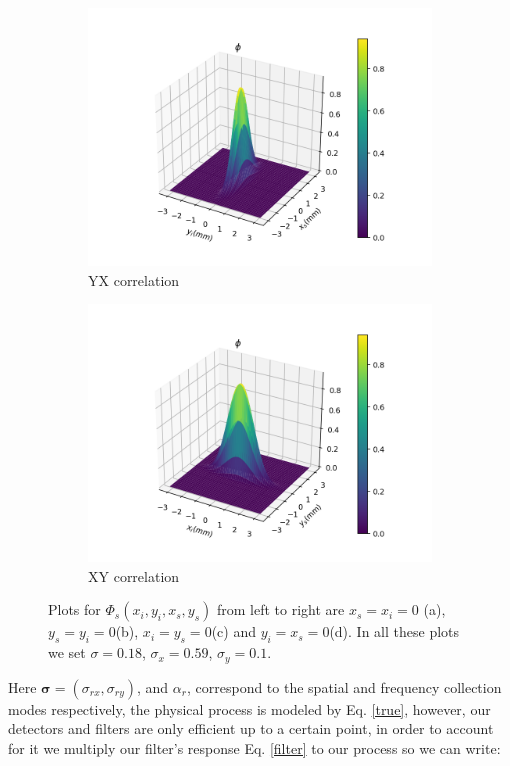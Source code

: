\documentclass[12pt]{book}
\begin{document}
\begin{figure}[t!]
\begin{subfigure}[b]{0.45\linewidth}
\includegraphics[width=\linewidth]{images/SPDC_yx.png}
\caption{YX correlation}
\end{subfigure}
\begin{subfigure}[b]{0.45\linewidth}
\includegraphics[width=\linewidth]{images/SPDC_xy.png}
\caption{XY correlation}
\end{subfigure}
\caption{Plots for $\Phi_{s}(x_{i},y_{i},x_{s},y_{s})$  from left to right are $x_{s}=x_{i}=0$ (a), $y_{s}=y_{i}=0$(b), $x_{i}=y_{s}=0$(c) and $y_{i}=x_{s}=0$(d). In all these plots we set $\sigma=0.18$, $\sigma_{x}=0.59$, $\sigma_{y}=0.1$.}
\label{SPDC}
\end{figure}

Here $\mathbf{\sigma}=(\sigma_{rx},\sigma_{ry})$, and $\alpha_{r}$, correspond to the spatial and frequency collection modes respectively, the physical process is modeled by Eq. \ref{true}, however, our detectors and filters are only efficient up to a certain point, in order to account for it we multiply our filter's response Eq. \ref{filter} to our process so we can write:
 
\end{document}
